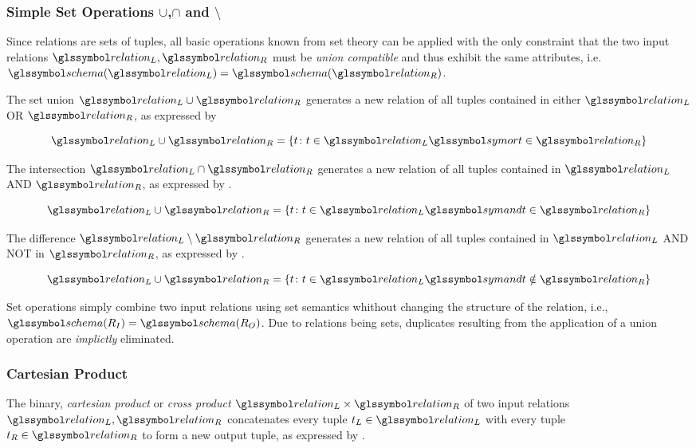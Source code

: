 \subsubsection{Simple Set Operations $\cup$,$\cap$ and $\setminus$}

Since relations are sets of tuples, all basic operations known from set theory can be applied with the only constraint that the two input relations $\relation_L,\relation_R$ must be \emph{union compatible} and thus exhibit the same attributes, i.e. $\schema(\relation_L) = \schema(\relation_R)$.

The set union $\relation_L \cup \relation_R$ generates a new relation of all tuples contained in either $\relation_L$ OR $\relation_R$, as expressed by 

\begin{equation}
    \label{equation:rel_op_union}
    \relation_L \cup \relation_R = \{ t \colon t \in \relation_L \symor t \in \relation_R \}
\end{equation}

The intersection $\relation_L \cap \relation_R$ generates a new relation of all tuples contained in $\relation_L$ AND $\relation_R$, as expressed by .

\begin{equation}
    \label{equation:rel_op_intersection}
    \relation_L \cup \relation_R = \{ t \colon t \in \relation_L \symand t \in \relation_R \}
\end{equation}

The difference $\relation_L \setminus \relation_R$ generates a new relation of all tuples contained in $\relation_L$ AND NOT in $\relation_R$, as expressed by .

\begin{equation}
    \label{equation:rel_op_difference}
    \relation_L \cup \relation_R = \{ t \colon t \in \relation_L \symand t \notin \relation_R \}
\end{equation}

Set operations simply combine two input relations using set semantics whithout changing the structure of the relation, i.e., $\schema(R_{I}) = \schema(R_{O})$. Due to relations being sets, duplicates resulting from the application of a union operation are \emph{implictly} eliminated.

\subsubsection{Cartesian Product}
The binary, \emph{cartesian product} or \emph{cross product} $\relation_L \times \relation_R$ of two input relations $\relation_L,\relation_R$ concatenates every tuple $t_{L} \in \relation_L$ with every tuple $t_{R} \in \relation_R$ to form a new output tuple, as expressed by .

